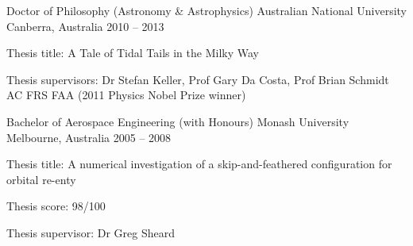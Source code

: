 
\begin{cventries}

  \cventry
    {Doctor of Philosophy (Astronomy \& Astrophysics)}
    {Australian National University}
    {Canberra, Australia}
    {2010 -- 2013}
    {
      \begin{cvitems}
        \item{Thesis title: A Tale of Tidal Tails in the Milky Way}
        \item{Thesis supervisors: Dr Stefan Keller, Prof Gary Da Costa, Prof Brian Schmidt AC FRS FAA (2011 Physics Nobel Prize winner)}
      \end{cvitems}
      \vspace{1em}
    }

  \cventry
    {Bachelor of Aerospace Engineering (with Honours)}
    {Monash University}
    {Melbourne, Australia}
    {2005 -- 2008}
    {
      \begin{cvitems}
        \item{Thesis title: A numerical investigation of a skip-and-feathered configuration for orbital re-enty}
        \item{Thesis score: 98/100}
        \item{Thesis supervisor: Dr Greg Sheard}
      \end{cvitems}
    }

\end{cventries}
